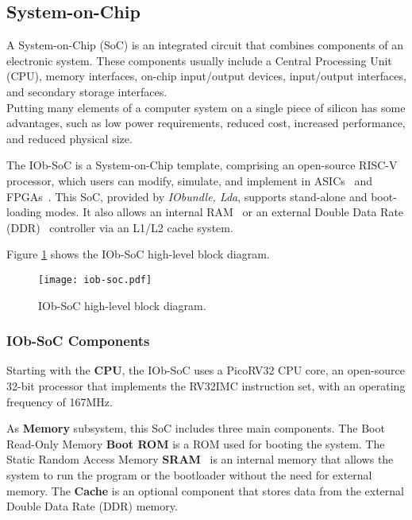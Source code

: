 

\subsection{System-on-Chip}
A System-on-Chip (SoC) is an integrated circuit that combines components of an electronic system. These components usually include a Central Processing Unit (CPU), memory interfaces, on-chip input/output devices, input/output interfaces, and secondary storage interfaces.\\
Putting many elements of a computer system on a single piece of silicon has some advantages, such as low power requirements, reduced cost, increased performance, and reduced physical size.

The IOb-SoC is a System-on-Chip template, comprising an open-source RISC-V~\cite{riscv} processor, which users can modify, simulate, and implement in ASICs~\cite{asic} and FPGAs~\cite{fpga}.
This SoC, provided by \textit{IObundle, Lda}, supports stand-alone and boot-loading modes. It also allows an internal RAM~\cite{ram} or an external Double Data Rate (DDR)~\cite{ddr} controller via an L1/L2 cache system. 

Figure \ref{fig:iob} shows the IOb-SoC high-level block diagram.

\vspace{0.1cm}

\begin{figure}[H]
\centerline{\texttt{[image: iob-soc.pdf]}}
\caption{IOb-SoC high-level block diagram.}
\label{fig:iob}
\end{figure}

\subsubsection{IOb-SoC Components}
Starting with the \textbf{CPU}, the IOb-SoC uses a PicoRV32 CPU core, an open-source 32-bit processor that implements the RV32IMC instruction set, with an operating frequency of 167MHz.

As \textbf{Memory} subsystem, this SoC includes three main components. The Boot Read-Only Memory \textbf{Boot ROM} is a ROM used for booting the system. The Static Random Access Memory \textbf{SRAM}~\cite{sram} is an internal memory that allows the system to run the program or the bootloader without the need for external memory. The \textbf{Cache} is an optional component that stores data from the external Double Data Rate (DDR) memory.


